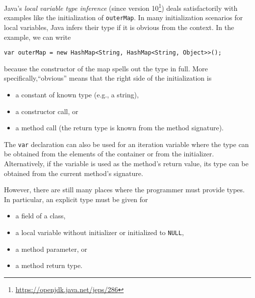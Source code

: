Java's \emph{local variable type inference} (since version 10\footnote{\url{https://openjdk.java.net/jeps/286}}) deals
satisfactorily with examples like the initialization of
\lstinline{outerMap}. 
In many initialization scenarios for local variables, Java infers their type
if it is obvious from the context. In the
example, we can write
\begin{lstlisting}[basicstyle=\ttfamily\fontsize{8}{9.6}\selectfont,style=fgj]
var outerMap = new HashMap<String, HashMap<String, Object>>();
\end{lstlisting}
because the constructor of the map spells out the type in
full. More specifically,``obvious'' means that the right side of the initialization is
\begin{itemize}
\item a constant of known type (e.g., a string),
\item a constructor call, or
\item a method call (the return type is known from the method
  signature).
\end{itemize}
The \lstinline{var} declaration can also be used for an iteration
variable where the type can be obtained from the elements of the
container or from the initializer.
Alternatively, if the variable is used as the method's return value,
its type can be obtained from the current method's signature.

However, there are still many places where the programmer must provide types. In
particular, an explicit type must be given for
\begin{itemize}
\item a field of a class,
\item a local variable without initializer or initialized to \lstinline{NULL},
\item a method parameter, or
\item a method return type.
\end{itemize}

